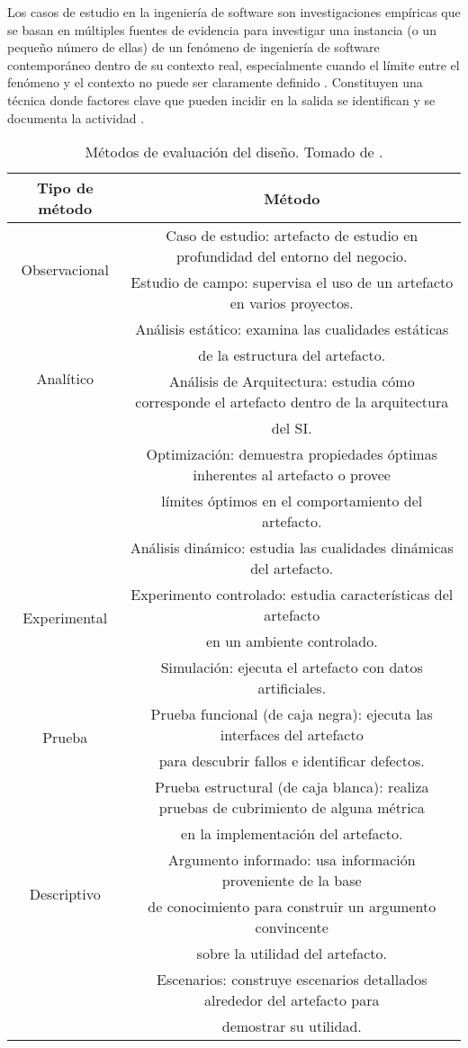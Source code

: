 Los casos de estudio en la ingeniería de software son investigaciones empíricas que se basan en múltiples fuentes de evidencia para investigar una instancia (o un pequeño número de ellas) de un fenómeno de ingeniería de software contemporáneo dentro de su contexto real, especialmente cuando el límite entre el fenómeno y el contexto no puede ser claramente definido \citep{Runeson:2012:CSR:2361717,Wohlin2012}. Constituyen una técnica donde factores clave que pueden incidir en la salida se identifican y se documenta la actividad \citep{stake1995art}. 

\begin{table}[H]
\begin{tabular}{|c|c|}
\hline 
Tipo de método & Método \\
\hline
\multirow{2}{*}{Observacional}& Caso de estudio: artefacto de estudio en profundidad del entorno del negocio.\\
& Estudio de campo: supervisa el uso de un artefacto en varios proyectos. \\
\hline 
\multirow{4}{*}{Analítico}& Análisis estático: examina las cualidades estáticas \\
& de la estructura del artefacto. \\
& Análisis de Arquitectura: estudia cómo corresponde el artefacto dentro de la arquitectura \\
& del SI.\\
& Optimización: demuestra propiedades óptimas inherentes al artefacto o provee  \\
& límites óptimos en el comportamiento del artefacto.\\
& Análisis dinámico: estudia las cualidades dinámicas del artefacto.\\
\hline 
\multirow{2}{*}{Experimental}& Experimento controlado: estudia características del artefacto\\
& en un ambiente controlado. \\
& Simulación: ejecuta el artefacto con datos artificiales. \\
\hline
\multirow{2}{*}{Prueba}& Prueba funcional (de caja negra): ejecuta las interfaces del artefacto\\
& para descubrir fallos e identificar defectos. \\
& Prueba estructural (de caja blanca): realiza pruebas de cubrimiento de alguna métrica \\
& en la implementación del artefacto. \\
\hline
\multirow{2}{*}{Descriptivo}& Argumento informado: usa información proveniente de la base\\
& de conocimiento para construir un argumento convincente \\
& sobre la utilidad del artefacto. \\
& Escenarios: construye escenarios detallados alrededor del artefacto para \\
& demostrar su utilidad. \\
\hline
\end{tabular} 
\caption{Métodos de evaluación del diseño. Tomado de \citep{Hevner:2004:DSI:2017212.2017217}.}
\label{tab: evaluacion}
\end{table}

